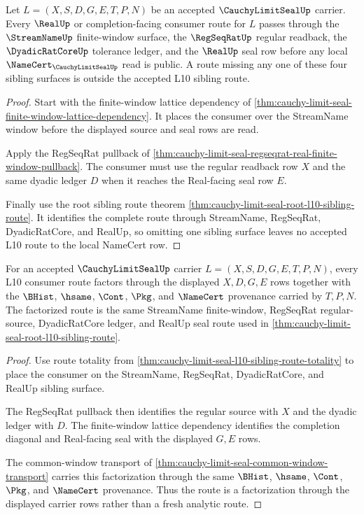 \begin{theorem}
\label{thm:cauchy-limit-seal-l10-sibling-route-totality}
Let $L=(X,S,D,G,E,T,P,N)$ be an accepted $\CauchyLimitSealUp$ carrier. Every $\RealUp$ or completion-facing consumer route for $L$ passes through the $\StreamNameUp$ finite-window surface, the $\RegSeqRatUp$ regular readback, the $\DyadicRatCoreUp$ tolerance ledger, and the $\RealUp$ seal row before any local $\NameCert_{\CauchyLimitSealUp}$ read is public. A route missing any one of these four sibling surfaces is outside the accepted L10 sibling route.
\end{theorem}
\begin{proof}
Start with the finite-window lattice dependency of \autoref{thm:cauchy-limit-seal-finite-window-lattice-dependency}. It places the consumer over the StreamName window before the displayed source and seal rows are read.

Apply the RegSeqRat pullback of \autoref{thm:cauchy-limit-seal-regseqrat-real-finite-window-pullback}. The consumer must use the regular readback row $X$ and the same dyadic ledger $D$ when it reaches the Real-facing seal row $E$.

Finally use the root sibling route theorem \autoref{thm:cauchy-limit-seal-root-l10-sibling-route}. It identifies the complete route through StreamName, RegSeqRat, DyadicRatCore, and RealUp, so omitting one sibling surface leaves no accepted L10 route to the local NameCert row.
\end{proof}

\begin{theorem}
\label{thm:cauchy-limit-seal-stream-regseq-seal-factorization}
For an accepted $\CauchyLimitSealUp$ carrier $L=(X,S,D,G,E,T,P,N)$, every L10 consumer route factors through the displayed $X,D,G,E$ rows together with the $\BHist$, $\hsame$, $\Cont$, $\Pkg$, and $\NameCert$ provenance carried by $T,P,N$. The factorized route is the same StreamName finite-window, RegSeqRat regular-source, DyadicRatCore ledger, and RealUp seal route used in \autoref{thm:cauchy-limit-seal-root-l10-sibling-route}.
\end{theorem}
\begin{proof}
Use route totality from \autoref{thm:cauchy-limit-seal-l10-sibling-route-totality} to place the consumer on the StreamName, RegSeqRat, DyadicRatCore, and RealUp sibling surface.

The RegSeqRat pullback then identifies the regular source with $X$ and the dyadic ledger with $D$. The finite-window lattice dependency identifies the completion diagonal and Real-facing seal with the displayed $G,E$ rows.

The common-window transport of \autoref{thm:cauchy-limit-seal-common-window-transport} carries this factorization through the same $\BHist$, $\hsame$, $\Cont$, $\Pkg$, and $\NameCert$ provenance. Thus the route is a factorization through the displayed carrier rows rather than a fresh analytic route.
\end{proof}

